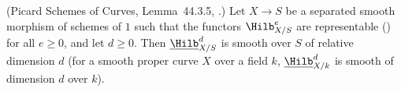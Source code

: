 \begin{lemma}
\label{lem:pc-hilb-smooth}
(Picard Schemes of Curves, Lemma~44.3.5,
.)  Let $X\to S$ be
a separated smooth morphism of schemes of
 $1$ such
that the functors $\Hilb^e_{X/S}$ are representable
() for all $e\geq0$, and let
$d\geq0$.  Then
$\underline{\Hilb}^d_{X/S}$ is smooth over $S$ of relative dimension $d$
(for a smooth proper curve $X$ over a field $k$,
$\underline{\Hilb}^d_{X/k}$ is smooth of dimension $d$ over $k$).
\end{lemma}
